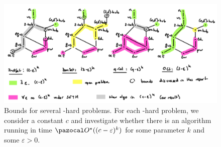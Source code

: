 \begin{figure}
    \includegraphics[width=\textwidth]{figures/state-of-the-art.png}
    \caption{Bounds for several \NP-hard problems. For each \NP-hard problem, we consider a constant $c$ and investigate whether there is an algorithm running in time $\O^\star((c-\varepsilon)^k)$ for some parameter $k$ and some $\varepsilon > 0$.}
    \label{fig:state-of-the-art}
\end{figure}